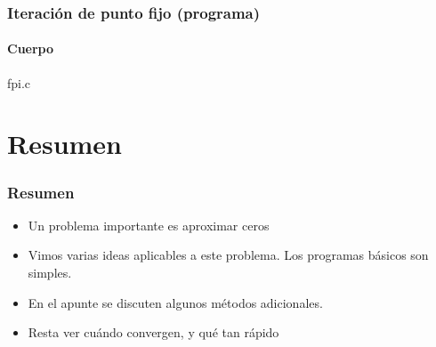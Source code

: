 \documentclass[english, spanish, fleqn,%
hyperref = {colorlinks, urlcolor = blue}%
]{beamer}
\begin{document}
\begin{frame}
  \frametitle{Iteración de punto fijo (programa)}
  \framesubtitle{Cuerpo}

  
                  {fpi.c}
\end{frame}

\section{Resumen}

\begin{frame}
  \setcounter{beamerpauses}{2}
  \frametitle{Resumen}

  \begin{itemize}
  \item
    Un problema importante es aproximar ceros
  \item
    Vimos varias ideas aplicables a este problema.
    Los programas básicos son simples.
  \item
    En el apunte se discuten algunos métodos adicionales.
  \item
    Resta ver cuándo convergen,
    y qué tan rápido
  \end{itemize}
\end{frame}
\end{document}
